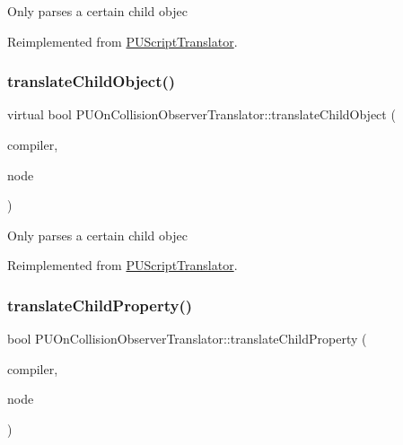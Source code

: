 Only parses a certain child objec 

Reimplemented from \hyperlink{classPUScriptTranslator_ab587d01348ae3e678cb700c719b2b113}{P\+U\+Script\+Translator}.

\mbox{\label{classPUOnCollisionObserverTranslator_a66a7eeb07344341aaafacf9045d5b16b}} 
\subsubsection{\texorpdfstring{translate\+Child\+Object()}{translateChildObject()}\hspace{0.1cm}{\footnotesize\ttfamily [2/2]}}
{\footnotesize\ttfamily virtual bool P\+U\+On\+Collision\+Observer\+Translator\+::translate\+Child\+Object (\begin{DoxyParamCaption}\item[{\hyperlink{classPUScriptCompiler}{P\+U\+Script\+Compiler} $\ast$}]{compiler,  }\item[{\hyperlink{classPUAbstractNode}{P\+U\+Abstract\+Node} $\ast$}]{node }\end{DoxyParamCaption})\hspace{0.3cm}{\ttfamily [virtual]}}

Only parses a certain child objec 

Reimplemented from \hyperlink{classPUScriptTranslator_ab587d01348ae3e678cb700c719b2b113}{P\+U\+Script\+Translator}.

\mbox{\label{classPUOnCollisionObserverTranslator_a73ceba39e5459d966ac3561f968d70b7}} 
\subsubsection{\texorpdfstring{translate\+Child\+Property()}{translateChildProperty()}\hspace{0.1cm}{\footnotesize\ttfamily [1/2]}}
{\footnotesize\ttfamily bool P\+U\+On\+Collision\+Observer\+Translator\+::translate\+Child\+Property (\begin{DoxyParamCaption}\item[{\hyperlink{classPUScriptCompiler}{P\+U\+Script\+Compiler} $\ast$}]{compiler,  }\item[{\hyperlink{classPUAbstractNode}{P\+U\+Abstract\+Node} $\ast$}]{node }\end{DoxyParamCaption})\hspace{0.3cm}{\ttfamily [virtual]}}

